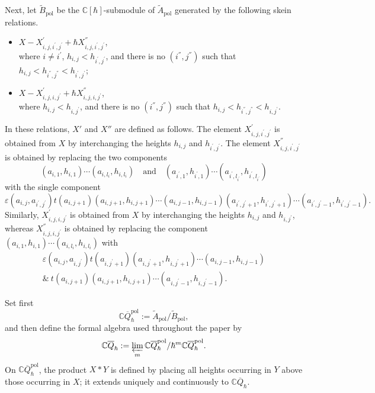 \documentclass[11pt,reqno]{amsart}
\theoremstyle{definition}
\newcommand{\qneck}{{\mathbb{C} \overline{Q}}_{\hbar}}
\begin{document}
Next, let \(\widetilde B_{\mathrm{pol}}\) be the
\(\mathbb{C}[\hbar]\)-submodule of \(\widetilde A_{\mathrm{pol}}\)
generated by the following skein relations.
\begin{itemize}
\item \(X-X^{'}_{i,j,i^{'},j^{'}}+\hbar X^{''}_{i,j,i^{'},j^{'}}\), \\[2mm]
where \(i\neq i^{'}\), \(h_{i,j}<h_{i^{'},j^{'}}\), and there is no \((i^{''},j^{''})\) such that
\(h_{i,j}<h_{i^{''},j^{''}}<h_{i^{'},j^{'}}\);\vspace{2mm}

\item \(X-X^{'}_{i,j,i,j^{'}}+\hbar X^{''}_{i,j,i,j^{'}}\), \\[2mm]
where \(h_{i,j}<h_{i,j^{'}}\), and there is no \((i^{''},j^{''})\) such that
\(h_{i,j}<h_{i^{''},j^{''}}<h_{i,j^{'}}\).
\end{itemize}
In these relations, \(X'\) and \(X''\) are defined as follows.
The element \(X^{'}_{i,j,i^{'},j^{'}}\) is obtained from \(X\) by interchanging the heights \(h_{i,j}\) and \(h_{i^{'},j^{'}}\).
The element \(X^{''}_{i,j,i^{'},j^{'}}\) is obtained by replacing the two components
\[
(a_{i,1},h_{i,1})\cdots(a_{i,l_i},h_{i,l_i})
\quad\text{and}\quad
(a_{i^{'},1},h_{i^{'},1})\cdots(a_{i^{'},l_{i^{'}}},h_{i^{'},l_{i^{'}}})
\]
with the single component
\begin{displaymath}
	\varepsilon(a_{i,j},a_{i^{'},j^{'}})t(a_{i,j+1})(a_{i,j+1},h_{i,j+1})\cdots(a_{i,j-1},h_{i,j-1})(a_{i^{'},j^{'}+1},h_{i^{'},j^{'}+1})\cdots(a_{i^{'},j^{'}-1},h_{i^{'},j^{'}-1}).
\end{displaymath}
Similarly, \(X^{'}_{i,j,i,j^{'}}\) is obtained from \(X\) by interchanging the heights \(h_{i,j}\) and \(h_{i,j^{'}}\), whereas \(X^{''}_{i,j,i,j^{'}}\) is obtained by replacing the component \((a_{i,1},h_{i,1})\cdots(a_{i,l_i},h_{i,l_i})\) with
\begin{align*}
\varepsilon(a_{i,j}, a_{i,j^{'}} )t(a_{i,j^{'}+1})(a_{i,j^{'}+1},h_{i,j^{'}+1})\cdots(a_{i,j-1},h_{i,j-1})\\
\&\ 
t(a_{i,j+1})(a_{i,j+1},h_{i,j+1})\cdots(a_{i,j^{'}-1},h_{i,j^{'}-1}).
\end{align*}

Set first
\[
\qneck^{\mathrm{pol}}
:=\widetilde A_{\mathrm{pol}}/\widetilde B_{\mathrm{pol}},
\]
and then define the formal algebra used throughout the paper by
\[
\qneck
:=
\varprojlim_m
\qneck^{\mathrm{pol}}/\hbar^m\qneck^{\mathrm{pol}}.
\]
On \(\qneck^{\mathrm{pol}}\), the product \(X\ast Y\) is defined by
placing all heights occurring in \(Y\) above those occurring in \(X\);
it extends uniquely and continuously to \(\qneck\).
\end{document}

